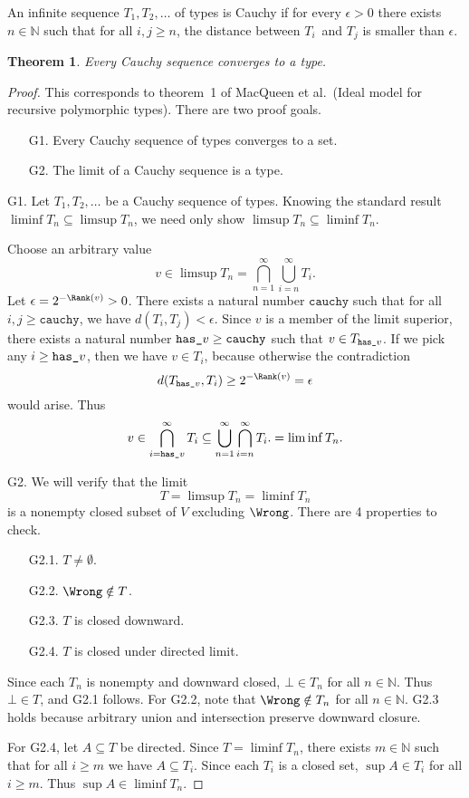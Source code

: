 \documentclass{amsart}
\newtheorem{theorem}[subsection]{Theorem}
\begin{document}

An infinite sequence $T_1,T_2,\ldots$ of types is Cauchy if for
every $\epsilon>0$ there exists $n\in\mathbb N$ such that for all
$i,j\ge n$, the distance between $T_i$~and $T_j$ is smaller than
$\epsilon$.

\begin{theorem}
Every Cauchy sequence converges to a type.
\end{theorem}

\begin{proof}
This corresponds to theorem~1 of MacQueen et al.\ (Ideal model
for recursive polymorphic types). There are two proof goals.
\begin{enumerate}
\item [G1.] Every Cauchy sequence of types converges to a set.
\item [G2.] The limit of a Cauchy sequence is a type.
\end{enumerate}

G1. Let $T_1,T_2,\ldots$ be a Cauchy sequence of types. Knowing
the standard result $\liminf T_n\subseteq\limsup T_n$, we need
only show $\limsup T_n\subseteq\liminf T_n$.

\def\Cauchy{\texttt{cauchy}}
\def\Hasv{{\texttt{has\textunderscore}v}}

Choose an arbitrary value
\[
v\in \limsup T_n = \bigcap_{n=1}^\infty\bigcup_{i = n}^\infty T_i.
\]
Let $\epsilon=2^{-\Rank(v)}>0$. There exists a natural number
$\Cauchy$ such that for all $i,j\ge\Cauchy$, we have
$d(T_i,T_j)<\epsilon$. Since $v$ is a member of the limit
superior, there exists a natural number $\Hasv\ge\Cauchy$ such
that $v\in T_\Hasv$. If we pick any $i\ge\Hasv$, then we have
$v\in T_i$, because otherwise the contradiction
\[
d(T_\Hasv, T_i)\ge2^{-\Rank(v)}=\epsilon
\]
would arise. Thus
\[
v\in
\bigcap_{i=\Hasv}^\infty T_i\subseteq
\bigcup_{n=1}^\infty\bigcap_{i = n}^\infty T_i.
=\liminf T_n.
\]

G2. We will verify that the limit
\[
T=\limsup T_n=\liminf T_n
\]
is a nonempty closed subset of $V$ excluding $\Wrong$. There are
4 properties to check.
\begin{enumerate}
\item [G2.1.] $T\neq\emptyset$.
\item [G2.2.] $\Wrong\notin T$.
\item [G2.3.] $T$ is closed downward.
\item [G2.4.] $T$ is closed under directed limit.
\end{enumerate}

Since each $T_n$ is nonempty and downward closed, $\bot\in T_n$
for all $n\in\mathbb N$. Thus $\bot\in T$, and G2.1 follows. For
G2.2, note that $\Wrong\notin T_n$ for all $n\in\mathbb N$. G2.3
holds because arbitrary union and intersection preserve
downward closure.

For G2.4, let $A\subseteq T$ be directed. Since $T=\liminf T_n$,
there exists $m\in\mathbb N$ such that for all $i\ge m$ we have
$A\subseteq T_i$. Since each $T_i$ is a closed set, $\sup A\in
T_i$ for all $i\ge m$. Thus $\sup A\in\liminf T_n$.
\end{proof}
\end{document}
